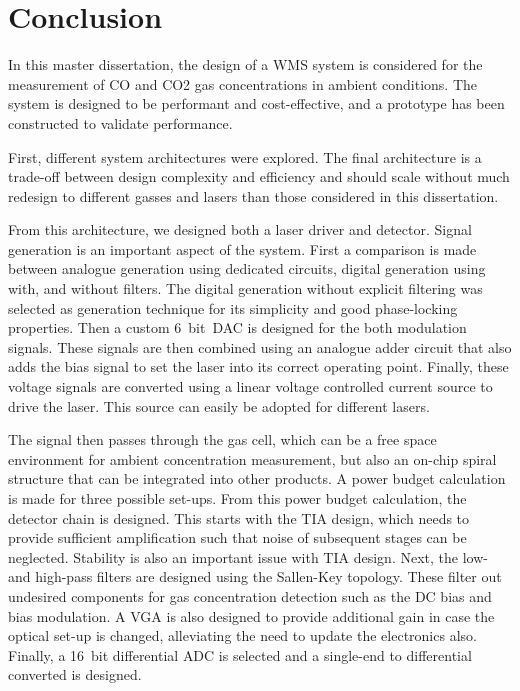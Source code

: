\documentclass[\home/main.tex]{subfiles}
\begin{document}
\chapter{Conclusion}\label{conclusion}

  In this master dissertation, the design of a \acrfull{WMS} system is considered for the measurement of \acrshort{CO} and \acrshort{CO2} gas concentrations in ambient conditions. The system is designed to be performant and cost-effective, and a prototype has been constructed to validate performance. 
  
  First, different system architectures were explored. The final architecture is a trade-off between design complexity and efficiency and should scale without much redesign to different gasses and lasers than those considered in this dissertation.
  
  From this architecture, we designed both a laser driver and detector. Signal generation is an important aspect of the system. First a comparison is made between analogue generation using dedicated circuits, digital generation using  with, and without filters. The digital generation without explicit filtering was selected as generation technique for its simplicity and good phase-locking properties. Then a custom \SI{6}{bit}~\acrshort{DAC} is designed for the both modulation signals. These signals are then combined using an analogue adder circuit that also adds the bias signal to set the laser into its correct operating point. Finally, these voltage signals are converted using a linear voltage controlled current source to drive the laser. This source can easily be adopted for different lasers. 
  
  The signal then passes through the gas cell, which can be a free space environment for ambient concentration measurement, but also an on-chip spiral structure that can be integrated into other products. A power budget calculation is made for three possible set-ups. From this power budget calculation, the detector chain is designed. This starts with the \acrshort{TIA} design, which needs to provide sufficient amplification such that noise of subsequent stages can be neglected. Stability is also an important issue with \acrshort{TIA} design. Next, the low- and high-pass filters are designed using the Sallen-Key topology. These filter out undesired components for gas concentration detection such as the \acrshort{DC} bias and bias modulation. A \acrshort{VGA} is also designed to provide additional gain in case the optical set-up is changed, alleviating the need to update the electronics also. Finally, a \SI{16}{bit} differential \acrshort{ADC} is selected and a single-end to differential converted is designed. 
  
\end{document}
